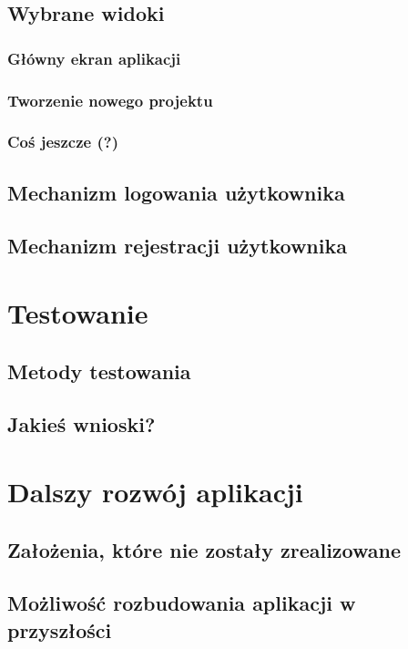 \documentclass[a4paper, 12pt, oneside]{article}
\begin{document}
	\subsection{Wybrane widoki}
			\subsubsection{Główny ekran aplikacji}
			\subsubsection{Tworzenie nowego projektu}
			\subsubsection{Coś jeszcze (?)}
	\subsection{Mechanizm logowania użytkownika}
	\subsection{Mechanizm rejestracji użytkownika}
\section{Testowanie}
	\subsection{Metody testowania}
	\subsection{Jakieś wnioski?}
\section{Dalszy rozwój aplikacji}
	\subsection{Założenia, które nie zostały zrealizowane}
	\subsection{Możliwość rozbudowania aplikacji w przyszłości}
\end{document}
